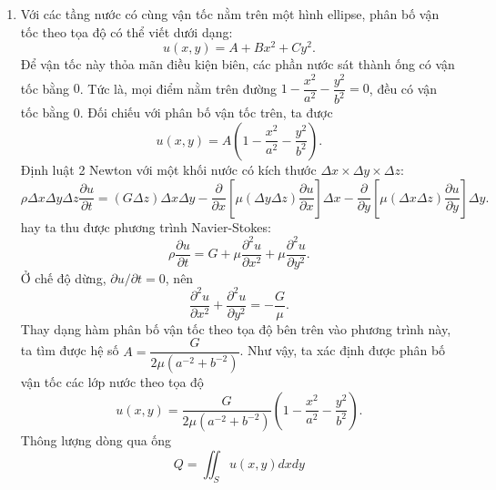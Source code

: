 \begin{enumerate}
    \item Với các tầng nước có cùng vận tốc nằm trên một hình ellipse, phân bố vận tốc theo tọa độ có thể viết dưới dạng:
    \begin{equation} \label{eq1_flow}
        u(x,y) = A + B x^2 + C y^2.
    \end{equation}
    Để vận tốc này thỏa mãn điều kiện biên, các phần nước sát thành ống có vận tốc bằng $0$. Tức là, mọi điểm nằm trên đường $1-\dfrac{x^2}{a^2}-\dfrac{y^2}{b^2}=0$, đều có vận tốc bằng $0$. Đối chiếu với phân bố vận tốc trên, ta được
    \begin{equation} \label{eq2_flow}
        u(x,y) = A \left( 1 - \dfrac{x^2}{a^2} - \dfrac{y^2}{b^2} \right).
    \end{equation}
    Định luật 2 Newton với một khối nước có kích thước $\Delta x \times \Delta y \times \Delta z$:
    \begin{equation} \label{eq3_flow}
        \rho \Delta x \Delta y \Delta z \dfrac{\partial u}{\partial t} = ( G \Delta z) \Delta x \Delta y - \dfrac{\partial}{\partial x} \left[ \mu (\Delta y \Delta z)   \dfrac{\partial u}{\partial x} \right] \Delta x - \dfrac{\partial}{\partial y} \left[ \mu  (\Delta x \Delta z) \dfrac{\partial u}{\partial y} \right] \Delta y.
    \end{equation}
    hay ta thu được phương trình Navier-Stokes:
    \begin{equation} \label{eq4_flow}
        \rho \dfrac{\partial u}{\partial t} = G + \mu \dfrac{\partial^2 u}{\partial x^2} + \mu \dfrac{\partial^2 u}{\partial y^2}.
    \end{equation}
    Ở chế độ dừng, $\partial u/ \partial t =0$, nên
    \begin{equation} \label{eq5_flow}
        \dfrac{\partial^2 u}{\partial x^2} + \dfrac{\partial^2 u}{\partial y^2} = - \dfrac{G}{\mu}.
    \end{equation}
    Thay dạng hàm phân bố vận tốc theo tọa độ bên trên vào phương trình này, ta tìm được hệ số $A=\dfrac{G}{2 \mu \left( a^{-2} + b^{-2} \right)}$. Như vậy, ta xác định được phân bố vận tốc các lớp nước theo tọa độ
    \begin{equation} \label{eq6_flow}
        u(x,y) = \dfrac{G}{2 \mu \left( a^{-2} + b^{-2} \right)} \left( 1 - \dfrac{x^2}{a^2} - \dfrac{y^2}{b^2} \right).
    \end{equation}
    Thông lượng dòng qua ống
    \begin{equation} \label{eq7_flow}
        Q = \iint_S u(x,y) dxdy 

\end{equation}
\end{enumerate}
